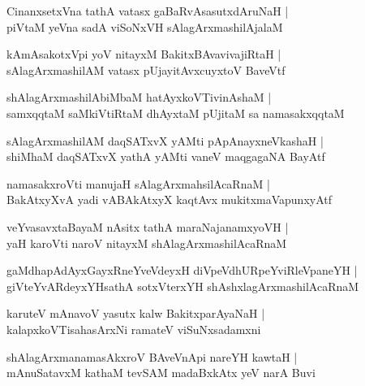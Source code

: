 \documentclass[twoside,12pt,openright]{book}
\newcounter{shloka}[chapter]
\begin{document}
\begin{shloka}%
CinanxsetxVna tathA vatasx gaBaRvAsasutxdAruNaH |\\
piVtaM yeVna sadA viSoNxVH sAlagArxmashilAjalaM 
\end{shloka}

\begin{shloka}%
kAmAsakotxVpi yoV nitayxM BakitxBAvavivajiRtaH |\\
sAlagArxmashilAM vatasx pUjayitAvxcuyxtoV BaveVtf
\end{shloka}

\begin{shloka}%
shAlagArxmashilAbiMbaM hatAyxkoVTivinAshaM |\\
samxqqtaM saMkiVtiRtaM dhAyxtaM pUjitaM sa namasakxqqtaM 
\end{shloka}

\begin{shloka}%
sAlagArxmashilAM daqSATxvX yAMti pApAnayxneVkashaH |\\
shiMhaM daqSATxvX yathA yAMti vaneV maqgagaNA BayAtf 
\end{shloka}

\begin{shloka}%
namasakxroVti manujaH sAlagArxmahsilAcaRnaM |\\
BakAtxyXvA yadi vABAkAtxyX kaqtAvx mukitxmaVapunxyAtf 
\end{shloka}

\begin{shloka}%
veYvasavxtaBayaM nAsitx tathA maraNajanamxyoVH |\\
yaH karoVti naroV nitayxM shAlagArxmashilAcaRnaM 
\end{shloka}

\begin{shloka}%
gaMdhapAdAyxGayxRneYveVdeyxH diVpeVdhURpeYviRleVpaneYH |\\
giVteYvARdeyxYHsathA sotxVterxYH shAshxlagArxmashilAcaRnaM 
\end{shloka}

\begin{shloka}%
karuteV mAnavoV yasutx kalw BakitxparAyaNaH |\\
kalapxkoVTisahasArxNi ramateV viSuNxsadamxni
\end{shloka}

\begin{shloka}%
shAlagArxmanamasAkxroV BAveVnApi nareYH kawtaH |\\
mAnuSatavxM kathaM tevSAM madaBxkAtx yeV narA Buvi
\end{shloka}
\end{document}
